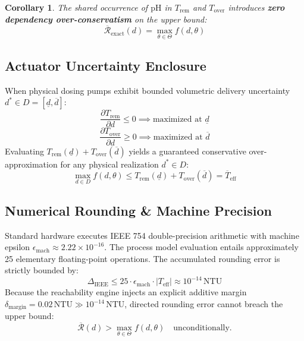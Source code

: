 \documentclass[10pt,twocolumn,letterpaper]{article}
\newtheorem{corollary}[theorem]{Corollary}
\theoremstyle{definition}
\newcommand{\Trem}{T_{\text{rem}}}
\newcommand{\Tover}{T_{\text{over}}}
\newcommand{\Rbar}{\overline{\mathcal{R}}}
\begin{document}
\begin{corollary}
The shared occurrence of $\text{pH}$ in $\Trem$ and $\Tover$ introduces \textbf{zero dependency over-conservatism} on the upper bound:
\begin{equation}
\Rbar_{\text{exact}}(d) = \max_{\theta \in \Theta} f(d, \theta)
\end{equation}
\end{corollary}

\subsection{Actuator Uncertainty Enclosure}
When physical dosing pumps exhibit bounded volumetric delivery uncertainty $d^* \in D = [\underline{d}, \overline{d}]$:
\begin{equation}
\frac{\partial \Trem}{\partial d} \le 0 \implies \text{maximized at } \underline{d}
\end{equation}
\begin{equation}
\frac{\partial \Tover}{\partial d} \ge 0 \implies \text{maximized at } \overline{d}
\end{equation}
Evaluating $\Trem(\underline{d}) + \Tover(\overline{d})$ yields a guaranteed conservative over-approximation for any physical realization $d^* \in D$:
\begin{equation}
\max_{d \in D} f(d, \theta) \le \Trem(\underline{d}) + \Tover(\overline{d}) = \overline{T}_{\text{eff}}
\end{equation}

\subsection{Numerical Rounding \& Machine Precision}
Standard hardware executes IEEE 754 double-precision arithmetic with machine epsilon $\epsilon_{\text{mach}} \approx 2.22 \times 10^{-16}$. The process model evaluation entails approximately 25 elementary floating-point operations. The accumulated rounding error is strictly bounded by:
\begin{equation}
\Delta_{\text{IEEE}} \le 25 \cdot \epsilon_{\text{mach}} \cdot |T_{\text{eff}}| \approx 10^{-14}\,\text{NTU}
\end{equation}
Because the reachability engine injects an explicit additive margin $\delta_{\text{margin}} = 0.02\,\text{NTU} \gg 10^{-14}\,\text{NTU}$, directed rounding error cannot breach the upper bound:
\begin{equation}
\Rbar(d) > \max_{\theta \in \Theta} f(d, \theta) \quad \text{unconditionally.}
\end{equation}
\end{document}
